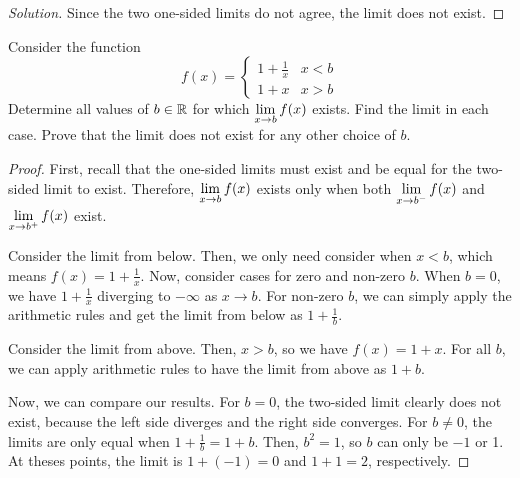 \begin{enumerate}[(a)]
\begin{proof}[Solution]
          Since the two one-sided limits do not agree, the limit does not exist.
        \end{proof}
\end{enumerate}

\question Consider the function
\[ f(x) = \begin{cases} 1+\frac{1}{x} & x < b \\ 1 + x & x > b \end{cases} \]
Determine all values of $b\in\mathbb{R}$ for which $\displaystyle\lim_{x\to b} f(x)$ exists.
Find the limit in each case.
Prove that the limit does not exist for any other choice of $b$.
\begin{proof}
  First, recall that the one-sided limits must exist and be equal for the two-sided limit to exist.
  Therefore, $\displaystyle\lim_{x\to b} f(x)$ exists only when both $\displaystyle\lim_{x\to b^-}f(x)$ and $\displaystyle\lim_{x\to b^+}f(x)$ exist.

  Consider the limit from below.
  Then, we only need consider when $x < b$, which means $f(x) = 1+\frac1x$.
  Now, consider cases for zero and non-zero $b$.
  When $b=0$, we have $1+\textstyle\frac{1}{x}$ diverging to $-\infty$ as $x \to b$.
  For non-zero $b$, we can simply apply the arithmetic rules and get the limit from below as $1+\frac1b$.

  Consider the limit from above.
  Then, $x > b$, so we have $f(x) = 1+x$.
  For all $b$, we can apply arithmetic rules to have the limit from above as $1+b$.

  Now, we can compare our results.
  For $b=0$, the two-sided limit clearly does not exist, because the left side diverges and the right side converges.
  For $b \neq 0$, the limits are only equal when $1+\frac1b = 1+b$.
  Then, $b^2 = 1$, so $b$ can only be $-1$ or 1.
  At theses points, the limit is $1+(-1)=0$ and $1+1=2$, respectively.
\end{proof}


